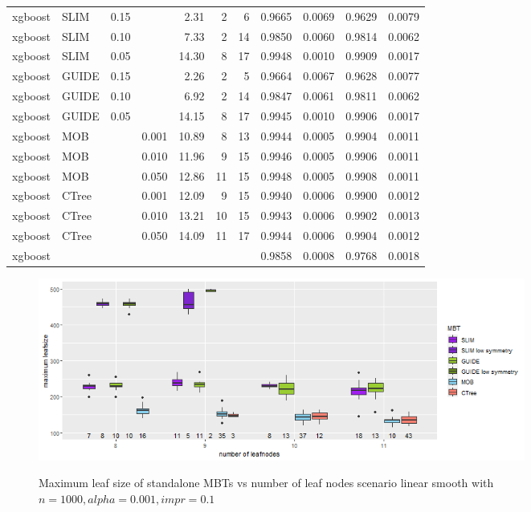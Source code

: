 \begin{table}
\begin{tabular}[t]{l|l|r|r|r|r|r|r|r|r|r}
xgboost & SLIM & 0.15 & & 2.31 & 2 & 6 & 0.9665 & 0.0069 & 0.9629 & 0.0079\\
xgboost & SLIM & 0.10 & & 7.33 & 2 & 14 & 0.9850 & 0.0060 & 0.9814 & 0.0062\\
xgboost & SLIM & 0.05 & & 14.30 & 8 & 17 & 0.9948 & 0.0010 & 0.9909 & 0.0017\\
xgboost & GUIDE & 0.15 & & 2.26 & 2 & 5 & 0.9664 & 0.0067 & 0.9628 & 0.0077\\
xgboost & GUIDE & 0.10 & & 6.92 & 2 & 14 & 0.9847 & 0.0061 & 0.9811 & 0.0062\\
xgboost & GUIDE & 0.05 & & 14.15 & 8 & 17 & 0.9945 & 0.0010 & 0.9906 & 0.0017\\
xgboost & MOB & & 0.001 & 10.89 & 8 & 13 & 0.9944 & 0.0005 & 0.9904 & 0.0011\\
xgboost & MOB & & 0.010 & 11.96 & 9 & 15 & 0.9946 & 0.0005 & 0.9906 & 0.0011\\
xgboost & MOB & & 0.050 & 12.86 & 11 & 15 & 0.9948 & 0.0005 & 0.9908 & 0.0011\\
xgboost & CTree & & 0.001 & 12.09 & 9 & 15 & 0.9940 & 0.0006 & 0.9900 & 0.0012\\
xgboost & CTree & & 0.010 & 13.21 & 10 & 15 & 0.9943 & 0.0006 & 0.9902 & 0.0013\\
xgboost & CTree & & 0.050 & 14.09 & 11 & 17 & 0.9944 & 0.0006 & 0.9904 & 0.0012\\
\hline
xgboost &  & & &  &  &  & 0.9858 & 0.0008 & 0.9768 & 0.0018\\
\hline
\end{tabular}
\label{tab:app_linear_smooth_1000}
\end{table}


\begin{figure}
\caption{Maximum leaf size of standalone MBTs vs number of leaf nodes scenario linear smooth with $n=1000, alpha = 0.001, impr = 0.1$}
    \includegraphics[width=16cm]{Figures/simulations/batchtools/basic_scenarios/linear_smooth/ls_1000_standalone_symmetrie.png}
    \label{fig:ls_1000_standalone_symmetrie}
\end{figure} 


